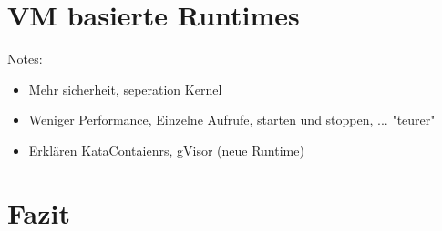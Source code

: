 \section{VM basierte Runtimes}
\label{sec:compVMbased}

Notes:
\begin{itemize}
	\item Mehr sicherheit, seperation Kernel
	\item Weniger Performance, Einzelne Aufrufe, starten und stoppen, ... "teurer" 
	\item Erklären KataContaienrs, gVisor (neue Runtime)
\end{itemize}

\section{Fazit}
\label{sec:compFazit}